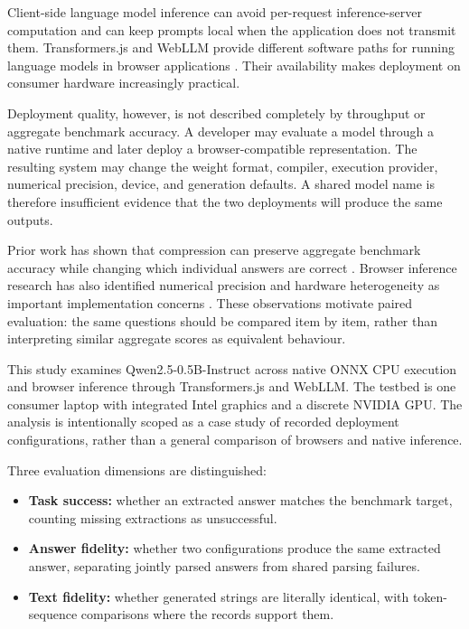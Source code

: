 \documentclass[conference]{IEEEtran}
\newcommand{\model}{Qwen2.5-0.5B-Instruct}
\begin{document}
Client-side language model inference can avoid per-request
inference-server computation and can keep prompts local when
the application does not transmit them. Transformers.js and
WebLLM provide different software paths for running language
models in browser applications \cite{transformersjs,webllm}.
Their availability makes deployment on consumer hardware
increasingly practical.

Deployment quality, however, is not described completely by
throughput or aggregate benchmark accuracy. A developer may
evaluate a model through a native runtime and later deploy a
browser-compatible representation. The resulting system may
change the weight format, compiler, execution provider,
numerical precision, device, and generation defaults.
A shared model name is therefore insufficient evidence that
the two deployments will produce the same outputs.

Prior work has shown that compression can preserve aggregate
benchmark accuracy while changing which individual answers
are correct \cite{accuracy}. Browser inference research has
also identified numerical precision and hardware
heterogeneity as important implementation concerns
\cite{llamas,maczan}. These observations motivate paired
evaluation: the same questions should be compared item by
item, rather than interpreting similar aggregate scores as
equivalent behaviour.

This study examines \model{} across native ONNX CPU execution
and browser inference through Transformers.js and WebLLM.
The testbed is one consumer laptop with integrated Intel
graphics and a discrete NVIDIA GPU. The analysis is
intentionally scoped as a case study of recorded deployment
configurations, rather than a general comparison of browsers
and native inference.

Three evaluation dimensions are distinguished:

\begin{itemize}
\item \textbf{Task success:} whether an extracted answer
matches the benchmark target, counting missing extractions
as unsuccessful.

\item \textbf{Answer fidelity:} whether two configurations
produce the same extracted answer, separating jointly
parsed answers from shared parsing failures.

\item \textbf{Text fidelity:} whether generated strings are
literally identical, with token-sequence comparisons where
the records support them.
\end{itemize}
\end{document}

